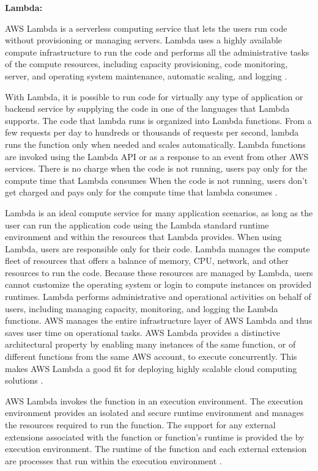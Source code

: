 \textbf{Lambda:}
\par AWS Lambda is a serverless computing service that lets the users run code without provisioning or managing servers.
Lambda uses a highly available compute infrastructure to run the code and performs all the administrative tasks of the compute resources, including capacity provisioning, code monitoring, server, and operating system maintenance, automatic scaling, and logging \cite{45}.

\par With Lambda, it is possible to run code for virtually any type of application or backend service by supplying the code in one of the languages that Lambda supports.
The code that lambda runs is organized into Lambda functions.
From a few requests per day to hundreds or thousands of
requests per second, lambda runs the function only when
needed and scales automatically.
Lambda functions are invoked using the Lambda API or as a response to an event from other AWS services.
There is no charge when the code is not running, users pay only for the compute time that Lambda consumes
When the code is not running, users don't get charged
and pays only for the compute time
that lambda consumes \cite{46}.

\par Lambda is an ideal compute service for many application scenarios, as long as the user can run the application code using the Lambda standard runtime environment and within the resources that Lambda provides.
When using Lambda, users are responsible only for their code.
Lambda manages the compute fleet of resources that offers a balance of memory, CPU, network, and other resources to run the code.
Because these resources are managed by Lambda, users cannot customize the operating system or login to compute instances on provided runtimes.
Lambda performs administrative and operational activities on behalf of users, including managing capacity, monitoring, and logging the Lambda functions.
AWS manages the entire infrastructure layer of AWS Lambda
and thus saves user time on operational tasks. AWS Lambda
provides a distinctive architectural property by enabling many instances of the same function, or of different functions from the same AWS account, to execute concurrently. This makes AWS Lambda a good fit for deploying highly scalable cloud computing solutions \cite{46}.

\par AWS Lambda invokes the function in an execution environment.
The execution environment provides an isolated and secure runtime environment and manages the resources required to run the function.
The support for any external extensions associated with
the function or function's runtime is provided the by
execution environment.
The runtime of the function and each external extension are
processes that run within the execution environment
\cite{46}.


